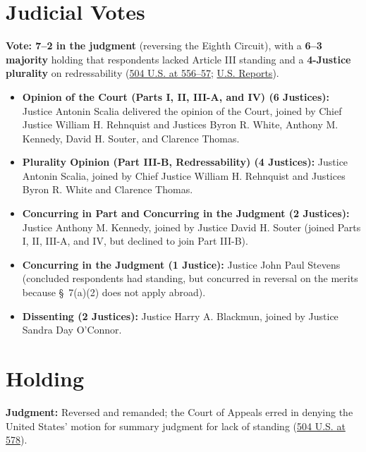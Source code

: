 \documentclass[12pt]{article}
\begin{document}
\section{Judicial Votes}
\textbf{Vote: 7--2 in the judgment} (reversing the Eighth Circuit), with a \textbf{6--3 majority} holding that respondents lacked Article III standing and a \textbf{4-Justice plurality} on redressability (\href{https://supreme.justia.com/cases/federal/us/504/555/}{504 U.S. at 556--57}; \href{https://tile.loc.gov/storage-services/service/ll/usrep/usrep504/usrep504555/usrep504555.pdf}{U.S. Reports}).
\begin{itemize}
\item \textbf{Opinion of the Court (Parts I, II, III-A, and IV) (6 Justices):} Justice Antonin Scalia delivered the opinion of the Court, joined by Chief Justice William H. Rehnquist and Justices Byron R. White, Anthony M. Kennedy, David H. Souter, and Clarence Thomas.
\item \textbf{Plurality Opinion (Part III-B, Redressability) (4 Justices):} Justice Antonin Scalia, joined by Chief Justice William H. Rehnquist and Justices Byron R. White and Clarence Thomas.
\item \textbf{Concurring in Part and Concurring in the Judgment (2 Justices):} Justice Anthony M. Kennedy, joined by Justice David H. Souter (joined Parts I, II, III-A, and IV, but declined to join Part III-B).
\item \textbf{Concurring in the Judgment (1 Justice):} Justice John Paul Stevens (concluded respondents had standing, but concurred in reversal on the merits because \S~7(a)(2) does not apply abroad).
\item \textbf{Dissenting (2 Justices):} Justice Harry A. Blackmun, joined by Justice Sandra Day O'Connor.
\end{itemize}

\section{Holding}
\textbf{Judgment:} Reversed and remanded; the Court of Appeals erred in denying the United States' motion for summary judgment for lack of standing (\href{https://supreme.justia.com/cases/federal/us/504/555/}{504 U.S. at 578}).
\end{document}
